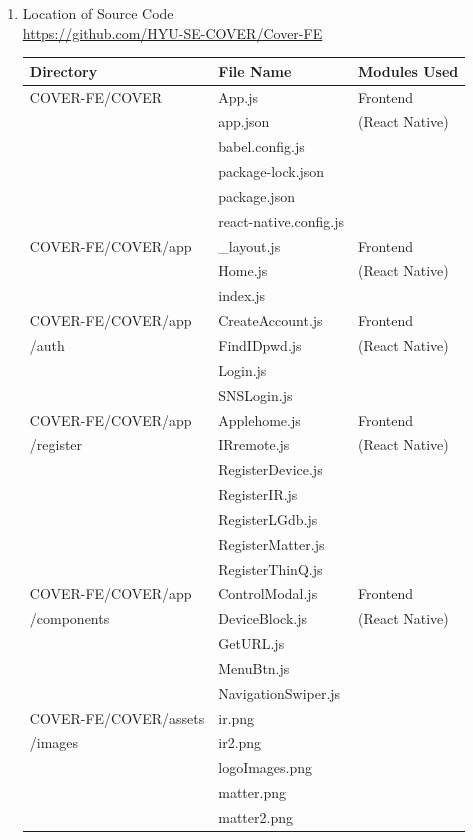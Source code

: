 \documentclass[conference]{IEEEtran}
\begin{document}
\begin{enumerate}[label=\arabic*.]
\item Location of Source Code\\
\url{https://github.com/HYU-SE-COVER/Cover-FE}
\begin{table}[h!]
\setlength{\extrarowheight}{2.5pt}
\centering
\begin{tabular}{|l|l|l|}
\hline
\textbf{Directory} & \textbf{File Name} & \textbf{Modules Used} \\
\hline
COVER-FE/COVER & App.js & Frontend \\
 & app.json & (React Native)  \\
 & babel.config.js &  \\
 & package-lock.json &  \\
 & package.json &  \\
 & react-native.config.js &  \\
\hline
COVER-FE/COVER/app & \_layout.js & Frontend \\
 & Home.js & (React Native)  \\
 & index.js &  \\
\hline
COVER-FE/COVER/app & CreateAccount.js & Frontend \\
/auth & FindIDpwd.js & (React Native)  \\
 & Login.js &  \\
 & SNSLogin.js &  \\
\hline
COVER-FE/COVER/app & Applehome.js & Frontend \\
/register & IRremote.js & (React Native)  \\
 & RegisterDevice.js &  \\
 & RegisterIR.js &  \\
 & RegisterLGdb.js &  \\
 & RegisterMatter.js &  \\
 & RegisterThinQ.js &  \\
\hline
COVER-FE/COVER/app & ControlModal.js & Frontend \\
/components & DeviceBlock.js & (React Native)  \\
 & GetURL.js &  \\
 & MenuBtn.js &  \\
 & NavigationSwiper.js &  \\
\hline
COVER-FE/COVER/assets & ir.png & \\
/images & ir2.png &  \\
 & logoImages.png &  \\
 & matter.png &  \\
 & matter2.png &  \\

\end{tabular}
\end{table}
\end{enumerate}
\end{document}
